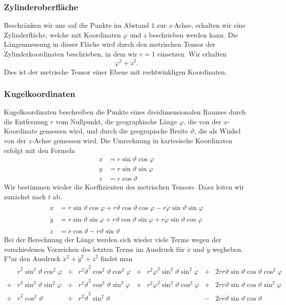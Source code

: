 \subsubsection{Zylinderoberfläche}
Beschränken wir uns auf die Punkte im Abstand $1$ zur $z$-Achse, erhalten
wir eine Zylinderfläche, welche mit Koordinaten $\varphi$ und $z$
beschrieben werden kann.
Die Längenmessung in dieser Fläche wird durch den metrischen
Tensor der Zylinderkoordinaten beschrieben, in dem wir $r=1$ einsetzen.
Wir erhalten
\[
\dot\varphi^2+\dot z^2.
\]
Dies ist der metrische Tensor einer Ebene mit rechtwinkligen Koordinaten.

\subsubsection{Kugelkoordinaten}
Kugelkoordinaten beschreiben die Punkte eines dreidimensionalen Raumes
durch die Entfernung $r$ vom Nullpunkt, die geographische Länge
$\varphi$, die von
der $x$-Koordinate gemessen wird, und durch die geograpische Breite
$\vartheta$,
die als Winkel von der $z$-Achse gemessen wird.
Die Umrechnung in kartesische Koordinaten erfolgt mit den Formeln
\begin{align*}
x&= r\sin\vartheta\cos\varphi\\
y&= r\sin\vartheta\sin\varphi\\
z&= r\cos\vartheta
\end{align*}
Wir bestimmen wieder die Koeffizienten des metrischen Tensors.
Dazu leiten wir zunächst nach $t$ ab.
\begin{align*}
\dot x
&=
\dot r\sin\vartheta\cos\varphi
+
r\dot\vartheta \cos\vartheta\cos\varphi
-
r\dot\varphi \sin\vartheta\sin\varphi
\\
\dot y
&=
\dot r\sin\vartheta\sin\varphi
+
r\dot\vartheta\cos\vartheta\sin\varphi
+
r\dot\varphi\sin\vartheta\cos\varphi
\\
\dot z
&=
\dot r\cos\vartheta
-
r\dot\vartheta \sin\vartheta
\end{align*}
Bei der Berechnung der Länge werden sich wieder viele Terme
wegen der verschiedenen Vorzeichen des letzten Terms im
Ausdruck für $\dot x$ und $\dot y$ wegheben.
F"ur den Ausdruck $ \dot x^2 + \dot y^2 + \dot z^2$ findet man
\[
\begin{array}{clclclcl}
 &
\dot r^2\sin^2\vartheta\cos^2\varphi
	&+&r^2\dot\vartheta^2\cos^2\vartheta\cos^2\varphi
		&+&r^2\dot\varphi^2\sin^2\vartheta\sin^2\varphi
			&+&2r\dot r\dot\vartheta\sin\vartheta\cos\vartheta\cos^2\varphi
\\
+&
\dot r^2\sin^2\vartheta\sin^2\varphi
	&+&r^2\dot\vartheta^2\cos^2\vartheta\sin^2\varphi
		&+&r^2\dot\varphi^2\sin^2\vartheta\cos^2\varphi
			&+&2r\dot r\dot\vartheta\sin\vartheta\cos\vartheta\sin^2\varphi
\\
+&
\dot r^2\cos^2\vartheta
	&+&r^2\dot\vartheta^2\sin^2\vartheta
		& &
			&-&2r\dot r\dot\vartheta \sin\vartheta \cos\vartheta
\\
\end{array}
\]
